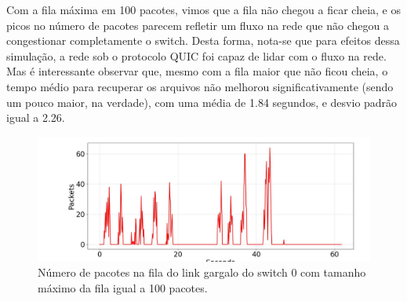 \documentclass[a4paper,12pt]{article}
\begin{document}
Com a fila máxima em 100 pacotes, vimos que a fila não chegou a ficar cheia, e os picos no número de pacotes parecem refletir um fluxo na rede que não chegou a congestionar completamente o switch. Desta forma, nota-se que para efeitos dessa simulação, a rede sob o protocolo QUIC foi capaz de lidar com o fluxo na rede. Mas é interessante observar que, mesmo com a fila maior que não ficou cheia, o tempo médio para recuperar os arquivos não melhorou significativamente (sendo um pouco maior, na verdade), com uma média de 1.84 segundos, e desvio padrão igual a 2.26.

\begin{figure}[ht!]
  \centering
  \includegraphics[width=0.5\columnwidth]{./bufferbloat/bb-q100/quic-part5-buffer-q100.jpg}
  \caption{Número de pacotes na fila do link gargalo do switch 0 com tamanho máximo da fila igual a 100 pacotes.}
\end{figure}
\end{document}
